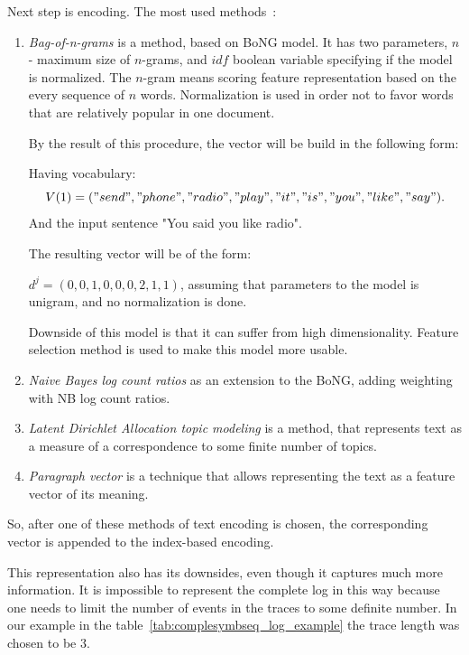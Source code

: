 Next step is encoding. The most used methods~\cite{DBLP:conf/bpm/TeinemaaDMF16}:

\begin{enumerate}
	\item \textit{Bag-of-n-grams} is a method, based on BoNG model. It has two parameters, $n$ - maximum size of $n$-grams, and $idf$ boolean variable specifying if the model is normalized. The $n$-gram means scoring feature representation based on the every sequence of $n$ words. Normalization is used in order not to favor words that are relatively popular in one document.
	
	By the result of this procedure, the vector will be build in the following form:
	
	Having vocabulary:
	\[V(1)=("send","phone","radio","play","it","is","you","like", "say").\]
	And the input sentence "You said you like radio".
	
	The resulting vector will be of the form: 
	
	$d^j=(0,0,1,0,0,0,2,1,1)$, assuming that parameters to the model is unigram, and no normalization is done.
	
	Downside of this model is that it can suffer from high dimensionality. Feature selection method is used to make this model more usable.
	
	\item \textit{Naive Bayes log count ratios} as an extension to the BoNG, adding weighting with NB log count ratios.
	
	\item \textit{Latent Dirichlet Allocation topic modeling} is a method, that represents text as a measure of a correspondence to some finite number of topics.
	
	\item \textit{Paragraph vector} is a technique that allows representing the text as a feature vector of its meaning.
\end{enumerate}

So, after one of these methods of text encoding is chosen, the corresponding vector is appended to the index-based encoding.

This representation also has its downsides, even though it captures much more information. It is impossible to represent the complete log in this way because one needs to limit the number of events in the traces to some definite number. In our example in the table~\ref{tab:complesymbseq_log_example} the trace length was chosen to be 3. 

